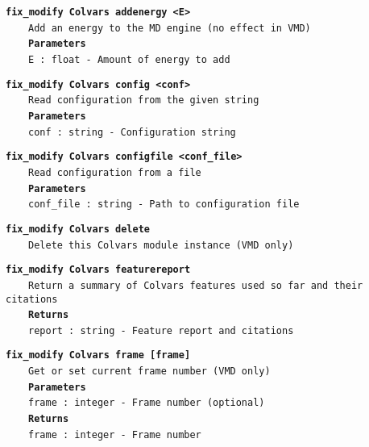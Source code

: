 \begin{mdexampleinput}{}
\texttt{\textbf{fix\_modify Colvars addenergy <E>}}
\\
\-~~~~\texttt{Add an energy to the MD engine (no effect in VMD)}
\\
\-~~~~\texttt{\textbf{Parameters}}
\\
\-~~~~\texttt{E : float - Amount of energy to add}
\end{mdexampleinput}
\begin{mdexampleinput}{}
\texttt{\textbf{fix\_modify Colvars config <conf>}}
\\
\-~~~~\texttt{Read configuration from the given string}
\\
\-~~~~\texttt{\textbf{Parameters}}
\\
\-~~~~\texttt{conf : string - Configuration string}
\end{mdexampleinput}
\begin{mdexampleinput}{}
\texttt{\textbf{fix\_modify Colvars configfile <conf\_file>}}
\\
\-~~~~\texttt{Read configuration from a file}
\\
\-~~~~\texttt{\textbf{Parameters}}
\\
\-~~~~\texttt{conf\_file : string - Path to configuration file}
\end{mdexampleinput}
\begin{mdexampleinput}{}
\texttt{\textbf{fix\_modify Colvars delete}}
\\
\-~~~~\texttt{Delete this Colvars module instance (VMD only)}
\end{mdexampleinput}
\begin{mdexampleinput}{}
\texttt{\textbf{fix\_modify Colvars featurereport}}
\\
\-~~~~\texttt{Return a summary of Colvars features used so far and their citations}
\\
\-~~~~\texttt{\textbf{Returns}}
\\
\-~~~~\texttt{report : string - Feature report and citations}
\end{mdexampleinput}
\begin{mdexampleinput}{}
\texttt{\textbf{fix\_modify Colvars frame [frame]}}
\\
\-~~~~\texttt{Get or set current frame number (VMD only)}
\\
\-~~~~\texttt{\textbf{Parameters}}
\\
\-~~~~\texttt{frame : integer - Frame number (optional)}
\\
\-~~~~\texttt{\textbf{Returns}}
\\
\-~~~~\texttt{frame : integer - Frame number}
\end{mdexampleinput}
